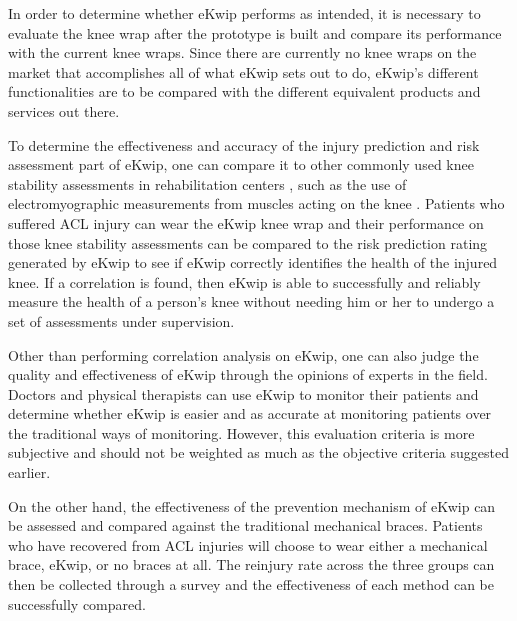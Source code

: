 In order to determine whether eKwip performs as intended, it is necessary to evaluate the knee wrap after the prototype is built and compare its performance with the current knee wraps. Since there are currently no knee wraps on the market that accomplishes all of what eKwip sets out to do, eKwip's different functionalities are to be compared with the different equivalent products and services out there.

To determine the effectiveness and accuracy of the injury prediction and risk assessment part of eKwip, one can compare it to other commonly used knee stability assessments in rehabilitation centers , such as the use of electromyographic measurements from muscles acting on the knee \cite{Sinkjar1991209}. Patients who suffered ACL injury can wear the eKwip knee wrap and their performance on those knee stability assessments can be compared to the risk prediction rating generated by eKwip to see if eKwip correctly identifies the health of the injured knee. If a correlation is found, then eKwip is able to successfully and reliably measure the health of a person’s knee without needing him or her to undergo a set of assessments under supervision. 

Other than performing correlation analysis on eKwip, one can also judge the quality and effectiveness of eKwip through the opinions of experts in the field. Doctors and physical therapists can use eKwip to monitor their patients and determine whether eKwip is easier and as accurate at monitoring patients over the traditional ways of monitoring. However, this evaluation criteria is more subjective and should not be weighted as much as the objective criteria suggested earlier.

On the other hand, the effectiveness of the prevention mechanism of eKwip can be assessed and compared against the traditional mechanical braces. Patients who have recovered from ACL injuries will choose to wear either a mechanical brace, eKwip, or no braces at all. The reinjury rate across the three groups can then be collected through a survey and the effectiveness of each method can be successfully compared.
